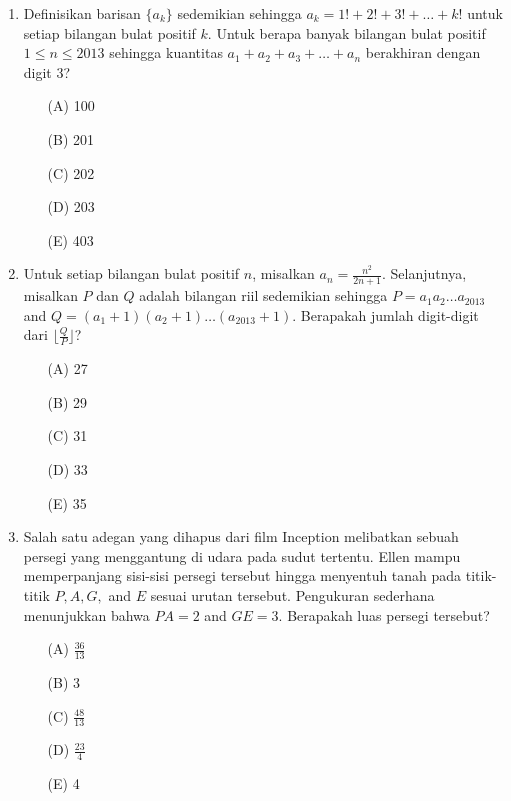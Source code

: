 \documentclass[11pt, a4paper]{scrartcl}
\begin{document}
\begin{enumerate}
    \item Definisikan barisan $\{a_{k}\}$ sedemikian sehingga $a_{k}=1!+2!+3!+\dots+k!$ untuk setiap bilangan bulat positif $k$. Untuk berapa banyak bilangan bulat positif $1\le n\le 2013$ sehingga kuantitas $a_{1}+a_{2}+a_{3}+\dots+a_{n}$ berakhiran dengan digit 3?
    \begin{itemize}
        \item[(A)] 100
        \item[(B)] 201
        \item[(C)] 202
        \item[(D)] 203
        \item[(E)] 403
    \end{itemize}

    \item Untuk setiap bilangan bulat positif $n$, misalkan $a_{n}=\frac{n^{2}}{2n+1}$. Selanjutnya, misalkan $P$ dan $Q$ adalah bilangan riil sedemikian sehingga $P=a_{1}a_{2}\dots a_{2013}$ and $Q=(a_{1}+1)(a_{2}+1)\dots(a_{2013}+1)$. Berapakah jumlah digit-digit dari $\lfloor\frac{Q}{P}\rfloor$?
    \begin{itemize}
        \item[(A)] 27
        \item[(B)] 29
        \item[(C)] 31
        \item[(D)] 33
        \item[(E)] 35
    \end{itemize}

    \item Salah satu adegan yang dihapus dari film Inception melibatkan sebuah persegi yang menggantung di udara pada sudut tertentu. Ellen mampu memperpanjang sisi-sisi persegi tersebut hingga menyentuh tanah pada titik-titik $P, A, G,$ and $E$ sesuai urutan tersebut. Pengukuran sederhana menunjukkan bahwa $PA=2$ and $GE=3$. Berapakah luas persegi tersebut?
    \begin{itemize}
        \item[(A)] $\frac{36}{13}$
        \item[(B)] 3
        \item[(C)] $\frac{48}{13}$
        \item[(D)] $\frac{23}{4}$
        \item[(E)] 4
    \end{itemize}


\end{enumerate}
\end{document}
